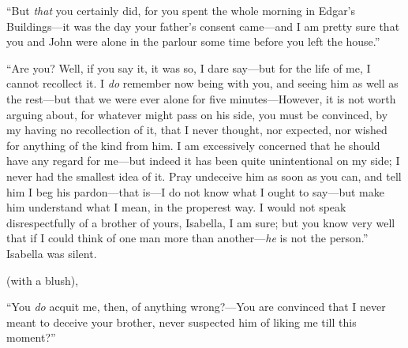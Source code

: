 “But {\em that} you certainly did, for you spent the whole morning in Edgar's Buildings---it was the day your father's consent came---and I am pretty sure that you and John were alone in the parlour some time before you left the house.”

“Are you? Well, if you say it, it was so, I dare say---but for the life of me, I cannot recollect it. I {\em do} remember now being with you, and seeing him as well as the rest---but that we were ever alone for five minutes---However, it is not worth arguing about, for whatever might pass on his side, you must be convinced, by my having no recollection of it, that I never thought, nor expected, nor wished for anything of the kind from him. I am excessively concerned that he should have any regard for me---but indeed it has been quite unintentional on my side; I never had the smallest idea of it. Pray undeceive him as soon as you can, and tell him I beg his pardon---that is---I do not know what I ought to say---but make him understand what I mean, in the properest way. I would not speak disrespectfully of a brother of yours, Isabella, I am sure; but you know very well that if I could think of one man more than another---{\em he} is not the person.” Isabella was silent. 

 (with a blush), 



“You {\em do} acquit me, then, of anything wrong?---You are convinced that I never meant to deceive your brother, never suspected him of liking me till this moment?”

